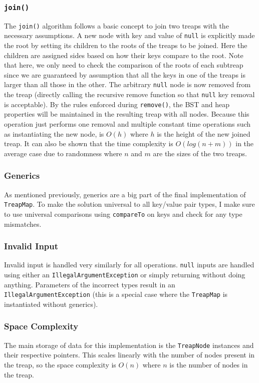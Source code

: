 \documentclass[11pt]{article}
\def\tt{\texttt}
\def\IAE{\tt{IllegalArgumentException}}
\def\TM{\tt{TreapMap}}
\def\rem{\tt{remove()}}
\def\join{\tt{join()}}
\def\tn{\tt{TreapNode}}
\begin{document}
\subsubsection{\join{}}	
The \join{} algorithm follows a basic concept to join two treaps with the necessary assumptions. A new node with key and value of \tt{null} is explicitly made the root by setting its children to the roots of the treaps to be joined. Here the children are assigned sides based on how their keys compare to the root. Note that here, we only need to check the comparison of the roots of each subtreap since we are guaranteed by assumption that all the keys in one of the treaps is larger than all those in the other. The arbitrary \tt{null} node is now removed from the treap (directly calling the recursive remove function so that \tt{null} key removal is acceptable). By the rules enforced during \rem{}, the BST and heap properties will be maintained in the resulting treap with all nodes. Because this operation just performs one removal and multiple constant time operations such as instantiating the new node, is $O(h)$ where $h$ is the height of the new joined treap. It can also be shown that the time complexity is $O(log(n+m))$ in the average case due to randomness where $n$ and $m$ are the sizes of the two treaps.
\subsubsection{Generics}
As mentioned previously, generics are a big part of the final implementation of \TM{}. To make the solution universal to all key/value pair types, I make sure to use universal comparisons using \tt{compareTo} on keys and check for any type mismatches. 
\subsubsection{Invalid Input}
Invalid input is handled very similarly for all operations. \tt{null} inputs are handled using either an \IAE{} or simply returning without doing anything. Parameters of the incorrect types result in an \IAE{} (this is a special case where the \TM{} is instantiated without generics).
\subsubsection{Space Complexity}
The main storage of data for this implementation is the \tn{} instances and their respective pointers. This scales linearly with the number of nodes present in the treap, so the space complexity is $O(n)$ where $n$ is the number of nodes in the treap.
\end{document}
